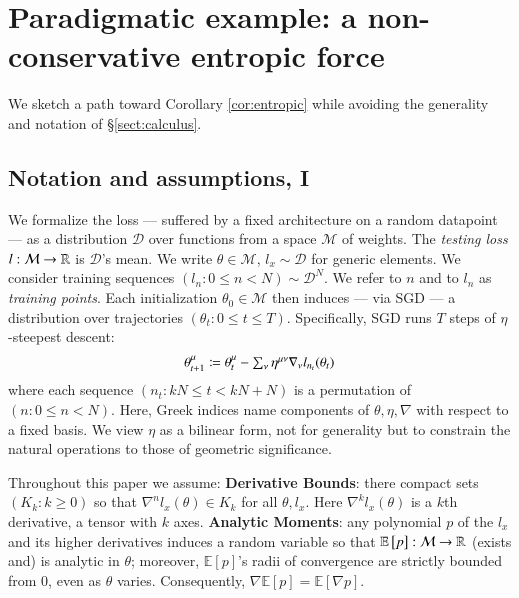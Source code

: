 \documentclass[anon,12pt]{colt2021} %
\newcommand{\squash}{\vspace{-0.15cm}}
\newcommand{\expct}[1]{\mathbb{E}\left[#1\right]}
\newcommand{\Dd}{\mathcal{D}}
\newcommand{\Mm}{\mathcal{M}}
\begin{document}
    \section{Paradigmatic example: a non-conservative entropic force}\label{sect:entropic-example}
            We sketch a path toward
            Corollary \ref{cor:entropic} while avoiding the generality 
            and notation of 
            \S\ref{sect:calculus}.\squash\squash 

        \subsection{Notation and assumptions, I}\label{sect:setup}
    
            We formalize the loss --- suffered by a fixed architecture on a
            random datapoint --- as a distribution $\Dd$ over functions from a
            space $\Mm$ of weights.  The \emph{testing loss} $l:\Mm\to\RR$ is
            $\Dd$'s mean.  We write $\theta\in\Mm$, $l_x\sim\Dd$ for generic
            elements.
            We consider training sequences $(l_n: 0\leq n<N) \sim \Dd^N$.  We
            refer to $n$ and to $l_n$ as \emph{training points}.
            Each initialization $\theta_0 \in \Mm$ then induces --- via SGD ---
            a distribution over trajectories $(\theta_t: 0\leq t \leq T)$.
            Specifically, SGD runs $T$ steps of $\eta$-steepest descent:
                \squash
            $$
                \textstyle
                \theta_{t+1}^\mu
                \coloneqq
                \theta_t^\mu -
                \sum_{\nu}
                \eta^{\mu\nu} \nabla_\nu l_{n_t}(\theta_t)
                \squash
            $$
            where each sequence $(n_t: kN\leq t<kN+N)$ is a permutation of $(n:
            0\leq n<N)$.  Here, Greek indices name components of
            $\theta,\eta,\nabla$ with respect to a fixed basis.  We view $\eta$
            as a bilinear form, not for generality but to constrain the natural
            operations to those of geometric significance.

            Throughout this paper we assume:
            \textbf{Derivative Bounds}:
            there compact sets $(K_k: k\geq 0)$ so that
            $\nabla^n l_x(\theta)\in K_k$ for all $\theta,l_x$. 
            Here $\nabla^k
            l_x(\theta)$ is a $k$th derivative, a tensor with $k$ axes.
            \textbf{Analytic Moments}:
            any polynomial $p$ of the $l_x$ and its higher derivatives
            induces a random variable so that
            $\expct{p}:\Mm\to\RR$ (exists and) is analytic in $\theta$;
            moreover, $\expct{p}$'s radii of convergence are strictly bounded from $0$,
            even as $\theta$ varies.
            Consequently, $\nabla \expct{p}=\expct{\nabla p}$.
\end{document}
